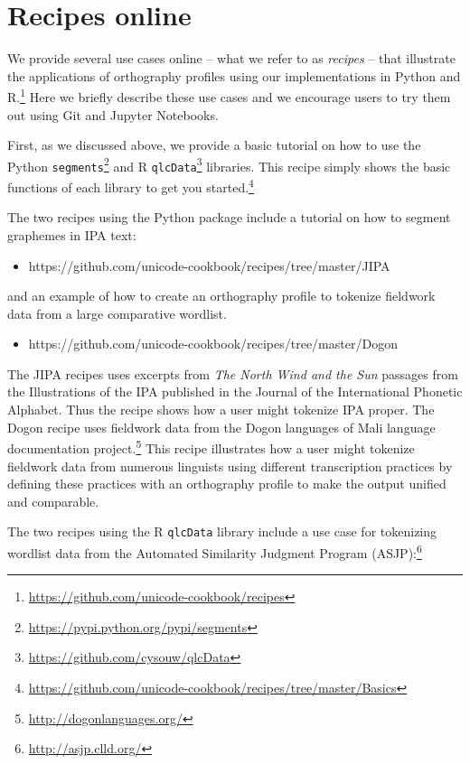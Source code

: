 \documentclass[output=inprep,
		biblatex
		]{LSP/langsci}\usepackage[]{graphicx}\usepackage[]{color}
\begin{document}
\section{Recipes online}
\label{use-cases}

We provide several use cases online -- what we refer to as \textit{recipes} -- that illustrate the applications of orthography profiles using our implementations in Python and R.\footnote{\url{https://github.com/unicode-cookbook/recipes}} Here we briefly describe these use cases and we encourage users to try them out using Git and Jupyter Notebooks.

First, as we discussed above, we provide a basic tutorial on how to use the Python \texttt{segments}\footnote{\url{https://pypi.python.org/pypi/segments}} and R \texttt{qlcData}\footnote{\url{https://github.com/cysouw/qlcData}} libraries. This recipe simply shows the basic functions of each library to get you started.\footnote{\url{https://github.com/unicode-cookbook/recipes/tree/master/Basics}}

The two recipes using the Python  package include a tutorial on how to segment graphemes in IPA text:

\begin{itemize}
	\item https://github.com/unicode-cookbook/recipes/tree/master/JIPA
\end{itemize}
	
\noindent and an example of how to create an orthography profile to tokenize fieldwork data from a large comparative wordlist.

\begin{itemize}
	\item https://github.com/unicode-cookbook/recipes/tree/master/Dogon
\end{itemize}

\noindent The JIPA recipes uses excerpts from \textit{The North Wind and the Sun} passages from the Illustrations of the IPA published in the Journal of the International Phonetic Alphabet. Thus the recipe shows how a user might tokenize IPA proper. The Dogon recipe uses fieldwork data from the Dogon languages of Mali language documentation project.\footnote{\url{http://dogonlanguages.org/}} This recipe illustrates how a user might tokenize fieldwork data from numerous linguists using different transcription practices by defining these practices with an orthography profile to make the output unified and comparable.

The two recipes using the R \texttt{qlcData} library include a use case for tokenizing wordlist data from the Automated Similarity Judgment Program (ASJP):\footnote{\url{http://asjp.clld.org/}}
\end{document}
